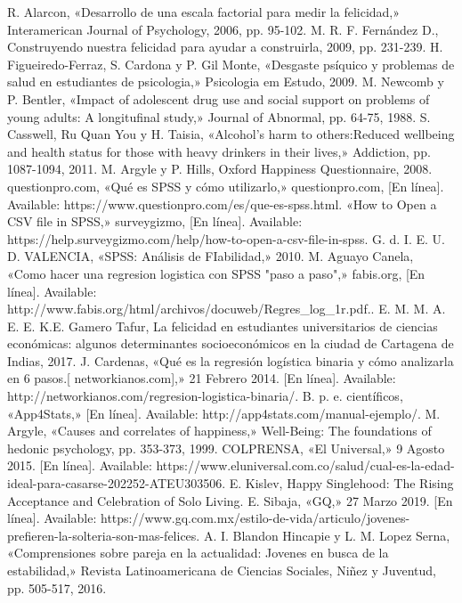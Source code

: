\documentclass[conference]{IEEEtran}
\begin{document}
\begin{thebibliography}{99}
R. Alarcon, «Desarrollo de una escala factorial para medir la felicidad,» Interamerican Journal of Psychology, 2006, pp. 95-102.
M. R. F. Fernández D., Construyendo nuestra felicidad para ayudar a construirla, 2009, pp. 231-239.
H. Figueiredo-Ferraz, S. Cardona y P. Gil Monte, «Desgaste psíquico y problemas de salud en estudiantes de psicologia,» Psicologia em Estudo, 2009. 
M. Newcomb y P. Bentler, «Impact of adolescent drug use and social support on problems of young adults: A longitufinal study,» Journal of Abnormal, pp. 64-75, 1988. 
S. Casswell, Ru Quan You y H. Taisia, «Alcohol's harm to others:Reduced wellbeing and health status for those with heavy drinkers in their lives,» Addiction, pp. 1087-1094, 2011. 
M. Argyle y P. Hills, Oxford Happiness Questionnaire, 2008. 
questionpro.com, «Qué es SPSS y cómo utilizarlo,» questionpro.com, [En línea]. Available: https://www.questionpro.com/es/que-es-spss.html.
«How to Open a CSV file in SPSS,» surveygizmo, [En línea]. Available: https://help.surveygizmo.com/help/how-to-open-a-csv-file-in-spss.
G. d. I. E. U. D. VALENCIA, «SPSS: Análisis de FIabilidad,» 2010.
M. Aguayo Canela, «Como hacer una regresion logistica con SPSS "paso a paso",» fabis.org, [En línea]. Available: http://www.fabis.org/html/archivos/docuweb/Regres\_log\_1r.pdf..
E. M. M. A. E. E. K.E. Gamero Tafur, La felicidad en estudiantes universitarios de ciencias económicas: algunos determinantes socioeconómicos en la ciudad de Cartagena de Indias, 2017. 
J. Cardenas, «Qué es la regresión logística binaria y cómo analizarla en 6 pasos.[ networkianos.com],» 21 Febrero 2014. [En línea]. Available: http://networkianos.com/regresion-logistica-binaria/.
B. p. e. científicos, «App4Stats,» [En línea]. Available: http://app4stats.com/manual-ejemplo/.
M. Argyle, «Causes and correlates of happiness,» Well-Being: The foundations of hedonic psychology, pp. 353-373, 1999. 
COLPRENSA, «El Universal,» 9 Agosto 2015. [En línea]. Available: https://www.eluniversal.com.co/salud/cual-es-la-edad-ideal-para-casarse-202252-ATEU303506.
E. Kislev, Happy Singlehood: The Rising Acceptance and Celebration of Solo Living. 
E. Sibaja, «GQ,» 27 Marzo 2019. [En línea]. Available: https://www.gq.com.mx/estilo-de-vida/articulo/jovenes-prefieren-la-solteria-son-mas-felices.
A. I. Blandon Hincapie y L. M. Lopez Serna, «Comprensiones sobre pareja en la actualidad: Jovenes en busca de la estabilidad,» Revista Latinoamericana de Ciencias Sociales, Niñez y Juventud, pp. 505-517, 2016. 

\end{thebibliography}
\end{document}
